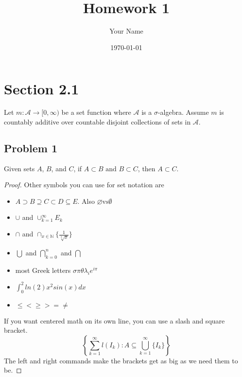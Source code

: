 \documentclass{article}
\title{Homework 1}
\author{Your Name}
\date\today
\begin{document}
\maketitle %

\thispagestyle{firstpage}
\section*{Section 2.1}
Let $m:\mathcal{A}\rightarrow [0,\infty)$ be a set function where $\mathcal{A}$ is a $\sigma$-algebra. Assume $m$ is countably additive over countable disjoint collections of sets in $\mathcal{A}$.

\subsection*{Problem 1}
Given sets $A$, $B$, and $C$, if $A\subset B \textrm{ and } B \subset C$, then $A \subset C$.
\begin{proof}
Other symbols you can use for set notation are
\begin{itemize}
\item$A \supset B \supseteq C \subset D \subseteq E$. Also $\varnothing \textrm{vs} \emptyset$
\item$\cup$ and $\cup_{k=1}^\infty E_k$
\item$\cap$ and $\cap_{x \in \mathbb{N}} \{\frac{1}{\sqrt[3]{x}}\}$
\item$\bigcup$ and $\bigcap\limits_{k=0}^n$ and $\bigcap$
\item most Greek letters $\sigma \pi \theta \lambda_i e^{i\pi}$
\item $\int_0^2 ln(2)x^2sin(x) dx$
\item$\leq < \geq > = \neq$
\end{itemize}
If you want centered math on its own line, you can use a slash and square bracket.\\
\[
\left \{
\sum\limits_{k=1}^\infty l(I_k):A\subseteq \bigcup_{k=1}^\infty \{I_k\}
\right \}
\]
The left and right commands make the brackets get as big as we need them to be.
\end{proof}

\clearpage %
\end{document}
